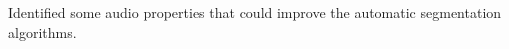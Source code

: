 \documentclass{article}
\begin{document}
Identified some audio properties that could improve the automatic segmentation algorithms.







\small

\end{document}

